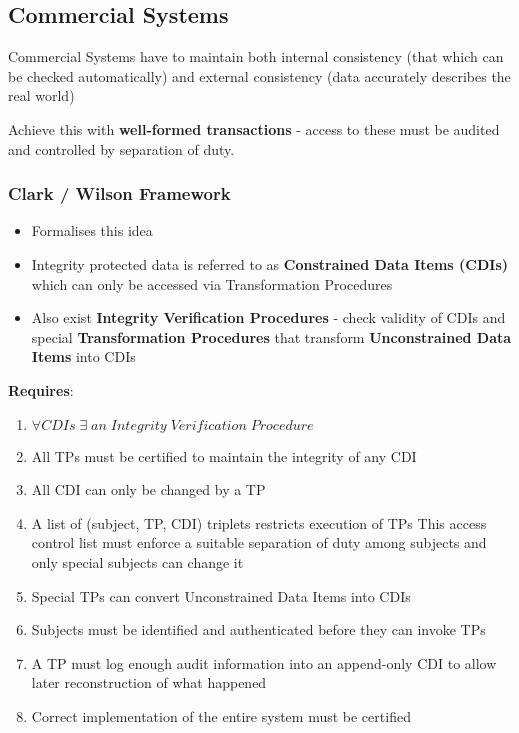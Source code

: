 \documentclass{article}
\begin{document}
\subsection{Commercial Systems}
Commercial Systems have to maintain both internal consistency (that which can be checked automatically) and external consistency (data accurately describes the real world)

Achieve this with \textbf{well-formed transactions} - access to these must be audited and controlled by separation of duty.

\subsubsection{Clark / Wilson Framework}
\begin{itemize}
	\item Formalises this idea
	\item Integrity protected data is referred to as \textbf{Constrained Data Items (CDIs)} which can only be accessed via Transformation Procedures
	\item Also exist \textbf{Integrity Verification Procedures} - check validity of CDIs and special \textbf{Transformation Procedures} that transform \textbf{Unconstrained Data Items} into CDIs
\end{itemize}

\textbf{Requires}:
\begin{enumerate}
	\item $\forall CDIs \; \exists \; an \; Integrity \; Verification \; Procedure$
	\item All TPs must be certified to maintain the integrity of any CDI
	\item All CDI can only be changed by a TP
	\item A list of (subject, TP, CDI) triplets restricts execution of TPs
	\subitem This access control list must enforce a suitable separation of duty among subjects and only special subjects can change it
	
	\item Special TPs can convert Unconstrained Data Items into CDIs
	\item Subjects must be identified and authenticated before they can invoke TPs
	\item A TP must log enough audit information into an append-only CDI to allow later reconstruction of what happened
	\item Correct implementation of the entire system must be certified
\end{enumerate}
\end{document}
